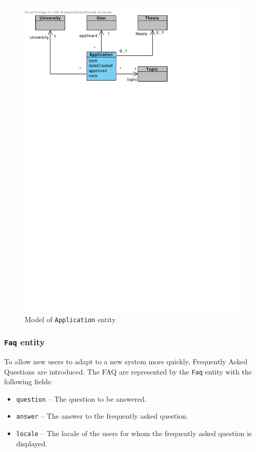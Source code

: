 \begin{figure}[h]
    \centering
        \includegraphics[trim=10 630 200 30, clip, keepaspectratio, width=\textwidth]{./images/domain-application-entity.pdf}
    \caption{Model of \texttt{Application} entity}
    \label{fig:domain-application-entity}
\end{figure}

\subsubsection{\textbf{\texttt{Faq} entity}}

To allow new users to adapt to a new system more quickly, Frequently Asked Questions are introduced. The FAQ are represented by the \texttt{Faq} entity with the following fields:

\begin{itemize}
    \item \texttt{question} -- The question to be answered.
    \item \texttt{answer} -- The answer to the frequently asked question.
    \item \texttt{locale} -- The locale of the users for whom the frequently asked question is displayed.
\end{itemize}

